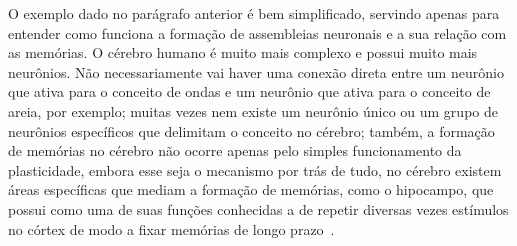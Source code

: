 O exemplo dado no parágrafo anterior é bem simplificado, servindo apenas para entender como funciona a formação de assembleias
neuronais e a sua relação com as memórias. O cérebro humano é muito mais complexo e possui muito mais neurônios. Não
necessariamente vai haver uma conexão direta entre um neurônio que ativa para o conceito de ondas e um neurônio que ativa para o
conceito de areia, por exemplo; muitas vezes nem existe um neurônio único ou um grupo de neurônios específicos que delimitam o
conceito no cérebro; também, a formação de memórias no cérebro não ocorre apenas pelo simples funcionamento da plasticidade,
embora esse seja o mecanismo por trás de tudo, no cérebro existem áreas específicas que mediam a formação de memórias, como o
hipocampo, que possui como uma de suas funções conhecidas a de repetir diversas vezes estímulos no córtex de modo a fixar memórias
de longo prazo~\cite{guptaHippocampal2010}.
